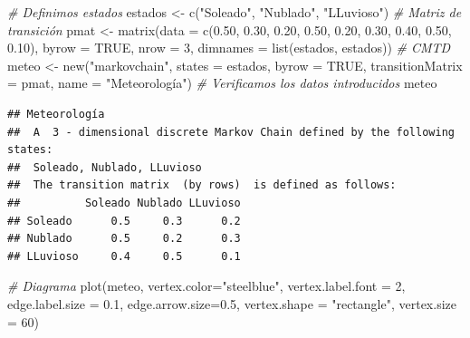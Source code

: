 \documentclass[
]{book}
\newenvironment{Shaded}{\begin{snugshade}}{\end{snugshade}}
\newcommand{\AttributeTok}[1]{\textcolor[rgb]{0.77,0.63,0.00}{#1}}
\newcommand{\CommentTok}[1]{\textcolor[rgb]{0.56,0.35,0.01}{\textit{#1}}}
\newcommand{\ConstantTok}[1]{\textcolor[rgb]{0.00,0.00,0.00}{#1}}
\newcommand{\DecValTok}[1]{\textcolor[rgb]{0.00,0.00,0.81}{#1}}
\newcommand{\FloatTok}[1]{\textcolor[rgb]{0.00,0.00,0.81}{#1}}
\newcommand{\FunctionTok}[1]{\textcolor[rgb]{0.00,0.00,0.00}{#1}}
\newcommand{\NormalTok}[1]{#1}
\newcommand{\OtherTok}[1]{\textcolor[rgb]{0.56,0.35,0.01}{#1}}
\newcommand{\StringTok}[1]{\textcolor[rgb]{0.31,0.60,0.02}{#1}}
\theoremstyle{definition}
\theoremstyle{definition}
\theoremstyle{definition}
\theoremstyle{definition}
\theoremstyle{remark}
\begin{document}
\begin{Shaded}
\begin{Highlighting}[]
\CommentTok{\# Definimos estados}
\NormalTok{estados }\OtherTok{\textless{}{-}} \FunctionTok{c}\NormalTok{(}\StringTok{"Soleado"}\NormalTok{, }\StringTok{"Nublado"}\NormalTok{, }\StringTok{"LLuvioso"}\NormalTok{)}
\CommentTok{\# Matriz de transición }
\NormalTok{pmat }\OtherTok{\textless{}{-}} \FunctionTok{matrix}\NormalTok{(}\AttributeTok{data =} \FunctionTok{c}\NormalTok{(}\FloatTok{0.50}\NormalTok{, }\FloatTok{0.30}\NormalTok{, }\FloatTok{0.20}\NormalTok{, }
                        \FloatTok{0.50}\NormalTok{, }\FloatTok{0.20}\NormalTok{, }\FloatTok{0.30}\NormalTok{, }
                        \FloatTok{0.40}\NormalTok{, }\FloatTok{0.50}\NormalTok{, }\FloatTok{0.10}\NormalTok{), }
               \AttributeTok{byrow =} \ConstantTok{TRUE}\NormalTok{, }\AttributeTok{nrow =} \DecValTok{3}\NormalTok{, }
               \AttributeTok{dimnames =} \FunctionTok{list}\NormalTok{(estados, estados))}
\CommentTok{\# CMTD}
\NormalTok{meteo }\OtherTok{\textless{}{-}} \FunctionTok{new}\NormalTok{(}\StringTok{"markovchain"}\NormalTok{, }\AttributeTok{states =}\NormalTok{ estados, }
                 \AttributeTok{byrow =} \ConstantTok{TRUE}\NormalTok{, }\AttributeTok{transitionMatrix =}\NormalTok{ pmat, }
             \AttributeTok{name =} \StringTok{"Meteorología"}\NormalTok{)}
\CommentTok{\# Verificamos los datos introducidos}
\NormalTok{meteo}
\end{Highlighting}
\end{Shaded}

\begin{verbatim}
## Meteorología 
##  A  3 - dimensional discrete Markov Chain defined by the following states: 
##  Soleado, Nublado, LLuvioso 
##  The transition matrix  (by rows)  is defined as follows: 
##          Soleado Nublado LLuvioso
## Soleado      0.5     0.3      0.2
## Nublado      0.5     0.2      0.3
## LLuvioso     0.4     0.5      0.1
\end{verbatim}

\begin{Shaded}
\begin{Highlighting}[]
\CommentTok{\# Diagrama}
\FunctionTok{plot}\NormalTok{(meteo, }\AttributeTok{vertex.color=}\StringTok{"steelblue"}\NormalTok{, }
     \AttributeTok{vertex.label.font =} \DecValTok{2}\NormalTok{, }
     \AttributeTok{edge.label.size =} \FloatTok{0.1}\NormalTok{,}
     \AttributeTok{edge.arrow.size=}\FloatTok{0.5}\NormalTok{, }
     \AttributeTok{vertex.shape =} \StringTok{"rectangle"}\NormalTok{, }
     \AttributeTok{vertex.size =} \DecValTok{60}\NormalTok{)}
\end{Highlighting}
\end{Shaded}
\end{document}

